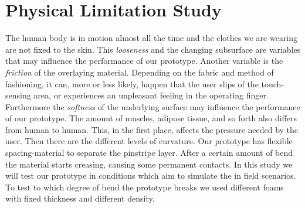 \section{Physical Limitation Study}
The human body is in motion almost all the time and the clothes we are wearing are not fixed to the skin. This \emph{looseness} and the changing subsurface are variables that may influence the performance of our prototype. Another variable is the \emph{friction} of the overlaying material. Depending on the fabric and method of fashioning, it can, more or less likely, happen that the user slips of the touch-sensing area, or experiences an unpleasant feeling in the operating finger. Furthermore the \emph{softness} of the underlying surface may influence the performance of our prototype. The amount of muscles, adipose tissue, and so forth also differs from human to human. This, in the first place, affects the pressure needed by the user. Then there are the different levels of curvature. Our prototype has flexible spacing-material to separate the pinstripe layer. After a certain amount of bend the material starts creasing, causing some permanent contacts. In this study we will test our prototype in conditions which aim to simulate the in field scenarios. To test to which degree of bend the prototype breaks we used different foams with fixed thickness and different density.

